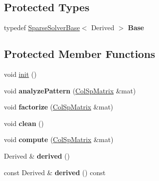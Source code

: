 \subsection*{Protected Types}
\begin{DoxyCompactItemize}
\item 
\mbox{\label{class_eigen_1_1_pastix_base_af66956d5d8ee804ee0d4d66f56f6baec}} 
typedef \mbox{\hyperlink{class_eigen_1_1_sparse_solver_base}{Sparse\+Solver\+Base}}$<$ Derived $>$ {\bfseries Base}
\end{DoxyCompactItemize}
\subsection*{Protected Member Functions}
\begin{DoxyCompactItemize}
\item 
void \mbox{\hyperlink{class_eigen_1_1_pastix_base_ac6202714edd1943646e34f16ad384336}{init}} ()
\item 
\mbox{\label{class_eigen_1_1_pastix_base_a1c3499de4bd707504925b8d54e57253a}} 
void {\bfseries analyze\+Pattern} (\mbox{\hyperlink{class_eigen_1_1_sparse_matrix}{Col\+Sp\+Matrix}} \&mat)
\item 
\mbox{\label{class_eigen_1_1_pastix_base_acbaa789672638fd5f621f52c3e951f7c}} 
void {\bfseries factorize} (\mbox{\hyperlink{class_eigen_1_1_sparse_matrix}{Col\+Sp\+Matrix}} \&mat)
\item 
\mbox{\label{class_eigen_1_1_pastix_base_aaee9ad715b2743747e0e88f53c1d8c47}} 
void {\bfseries clean} ()
\item 
\mbox{\label{class_eigen_1_1_pastix_base_a4173afa8a88aec8f1346372b2de71af9}} 
void {\bfseries compute} (\mbox{\hyperlink{class_eigen_1_1_sparse_matrix}{Col\+Sp\+Matrix}} \&mat)
\item 
\mbox{\label{class_eigen_1_1_pastix_base_ad213fb2c2199ca597b96f1f79653637f}} 
Derived \& {\bfseries derived} ()
\item 
\mbox{\label{class_eigen_1_1_pastix_base_af5f23a7e048060c3082c5a1ddfa91932}} 
const Derived \& {\bfseries derived} () const
\end{DoxyCompactItemize}
